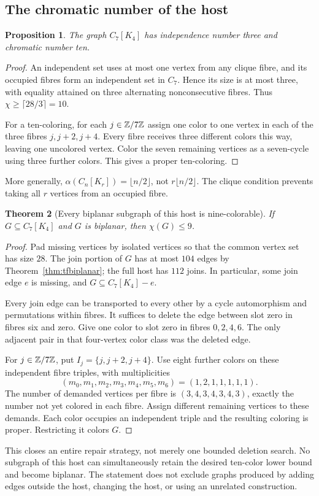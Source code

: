 \documentclass[11pt,letterpaper]{article}
\newtheorem{theorem}{Theorem}[section]
\newtheorem{proposition}[theorem]{Proposition}
\theoremstyle{definition}
\theoremstyle{remark}\newtheorem{remark}[theorem]{Remark}
\begin{document}
\subsection{The chromatic number of the host}
\begin{proposition}\label{prop:chi10}
The graph $C_7[K_4]$ has independence number three and chromatic number ten.
\end{proposition}
\begin{proof}
An independent set uses at most one vertex from any clique fibre, and its occupied fibres form an independent set in $C_7$. Hence its size is at most three, with equality attained on three alternating nonconsecutive fibres. Thus $\chi\geq\lceil28/3\rceil=10$.

For a ten-coloring, for each $j\in\mathbb Z/7\mathbb Z$ assign one color to one vertex in each of the three fibres $j,j+2,j+4$. Every fibre receives three different colors this way, leaving one uncolored vertex. Color the seven remaining vertices as a seven-cycle using three further colors. This gives a proper ten-coloring.
\end{proof}
More generally, $\alpha(C_n[K_r])=\lfloor n/2\rfloor$, not $r\lfloor n/2\rfloor$. The clique condition prevents taking all $r$ vertices from an occupied fibre.

\begin{theorem}[Every biplanar subgraph of this host is nine-colorable]\label{thm:nine}
If $G\subseteq C_7[K_4]$ and $G$ is biplanar, then $\chi(G)\leq9$.
\end{theorem}
\begin{proof}
Pad missing vertices by isolated vertices so that the common vertex set has size $28$. The join portion of $G$ has at most $104$ edges by Theorem~\ref{thm:tfbiplanar}; the full host has $112$ joins. In particular, some join edge $e$ is missing, and $G\subseteq C_7[K_4]-e$.

Every join edge can be transported to every other by a cycle automorphism and permutations within fibres. It suffices to delete the edge between slot zero in fibres six and zero. Give one color to slot zero in fibres $0,2,4,6$. The only adjacent pair in that four-vertex color class was the deleted edge.

For $j\in\mathbb Z/7\mathbb Z$, put $I_j=\{j,j+2,j+4\}$. Use eight further colors on these independent fibre triples, with multiplicities
\[
(m_0,m_1,m_2,m_3,m_4,m_5,m_6)=(1,2,1,1,1,1,1).
\]
The number of demanded vertices per fibre is $(3,4,3,4,3,4,3)$, exactly the number not yet colored in each fibre. Assign different remaining vertices to these demands. Each color occupies an independent triple and the resulting coloring is proper. Restricting it colors $G$.
\end{proof}
This closes an entire repair strategy, not merely one bounded deletion search. No subgraph of this host can simultaneously retain the desired ten-color lower bound and become biplanar. The statement does not exclude graphs produced by adding edges outside the host, changing the host, or using an unrelated construction.
\end{document}
